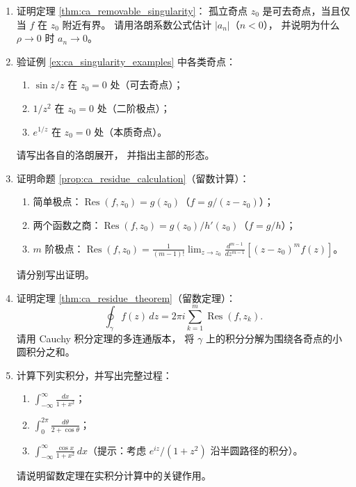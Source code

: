\begin{enumerate}[leftmargin=3em, label=\textbf{题 \arabic*}]
    \item 证明定理 \ref{thm:ca_removable_singularity}：
    孤立奇点 $z_0$ 是可去奇点，当且仅当 $f$ 在 $z_0$ 附近有界。
    请用洛朗系数公式估计 $|a_n|$（$n<0$），
    并说明为什么 $\rho\to 0$ 时 $a_n\to 0$。

    \item 验证例 \ref{ex:ca_singularity_examples} 中各类奇点：
    \begin{enumerate}[label=(\roman*)]
        \item $\sin z/z$ 在 $z_0=0$ 处（可去奇点）；
        \item $1/z^2$ 在 $z_0=0$ 处（二阶极点）；
        \item $e^{1/z}$ 在 $z_0=0$ 处（本质奇点）。
    \end{enumerate}
    请写出各自的洛朗展开，
    并指出主部的形态。

    \item 证明命题 \ref{prop:ca_residue_calculation}（留数计算）：
    \begin{enumerate}[label=(\roman*)]
        \item 简单极点：$\operatorname{Res}(f,z_0)=g(z_0)$（$f=g/(z-z_0)$）；
        \item 两个函数之商：$\operatorname{Res}(f,z_0)=g(z_0)/h'(z_0)$（$f=g/h$）；
        \item $m$ 阶极点：$\operatorname{Res}(f,z_0)=\frac{1}{(m-1)!}\lim_{z\to z_0}\frac{d^{m-1}}{dz^{m-1}}[(z-z_0)^m f(z)]$。
    \end{enumerate}
    请分别写出证明。

    \item 证明定理 \ref{thm:ca_residue_theorem}（留数定理）：
    \[
    \oint_\gamma f(z)\,dz=2\pi i\sum_{k=1}^m\operatorname{Res}(f,z_k).
    \]
    请用 Cauchy 积分定理的多连通版本，
    将 $\gamma$ 上的积分分解为围绕各奇点的小圆积分之和。

    \item 计算下列实积分，并写出完整过程：
    \begin{enumerate}[label=(\roman*)]
        \item $\displaystyle\int_{-\infty}^{\infty}\frac{dx}{1+x^2}$；
        \item $\displaystyle\int_0^{2\pi}\frac{d\theta}{2+\cos\theta}$；
        \item $\displaystyle\int_{-\infty}^{\infty}\frac{\cos x}{1+x^2}\,dx$（提示：考虑 $e^{iz}/(1+z^2)$ 沿半圆路径的积分）。
    \end{enumerate}
    请说明留数定理在实积分计算中的关键作用。


\end{enumerate}
